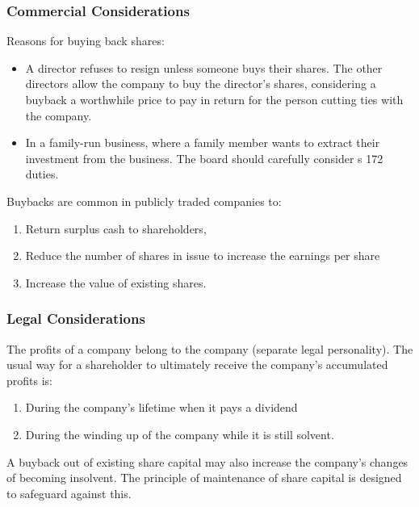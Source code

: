 \documentclass[
]{article}
\providecommand{\tightlist}{%
  \setlength{\itemsep}{0pt}\setlength{\parskip}{0pt}}
\begin{document}
\hypertarget{commercial-considerations}{%
\subsubsection{Commercial
Considerations}\label{commercial-considerations}}

Reasons for buying back shares:

\begin{itemize}
\tightlist
\item
  A director refuses to resign unless someone buys their shares. The
  other directors allow the company to buy the director's shares,
  considering a buyback a worthwhile price to pay in return for the
  person cutting ties with the company.
\item
  In a family-run business, where a family member wants to extract their
  investment from the business. The board should carefully consider s
  172 duties.
\end{itemize}

Buybacks are common in publicly traded companies to:

\begin{enumerate}
\def\labelenumi{\arabic{enumi}.}
\tightlist
\item
  Return surplus cash to shareholders,
\item
  Reduce the number of shares in issue to increase the earnings per
  share
\item
  Increase the value of existing shares.
\end{enumerate}

\hypertarget{legal-considerations}{%
\subsubsection{Legal Considerations}\label{legal-considerations}}

The profits of a company belong to the company (separate legal
personality). The usual way for a shareholder to ultimately receive the
company's accumulated profits is:

\begin{enumerate}
\def\labelenumi{\arabic{enumi}.}
\tightlist
\item
  During the company's lifetime when it pays a dividend
\item
  During the winding up of the company while it is still solvent.
\end{enumerate}

A buyback out of existing share capital may also increase the company's
changes of becoming insolvent. The principle of maintenance of share
capital is designed to safeguard against this.
\end{document}
